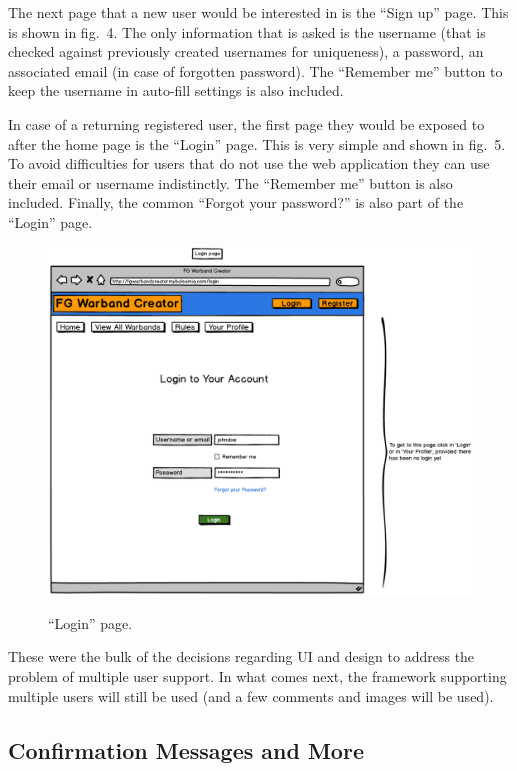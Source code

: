 \documentclass[12pt,a4paper]{article}
\begin{document}
The next page that a new user would be interested in is the ``Sign up'' page. This is shown in fig.~4. The only information that is asked is the username (that is checked against previously created usernames for uniqueness), a password, an associated email (in case of forgotten password). The ``Remember me'' button to keep the username in auto-fill settings is also included. 

In case of a returning registered user, the first page they would be exposed to after the home page is the ``Login'' page. This is very simple and shown in fig.~5. To avoid difficulties for users that do not use the web application they can use their email or username indistinctly. The ``Remember me'' button is also included. Finally, the common ``Forgot your password?'' is also part of the ``Login'' page.

\begin{figure}[h!]
 \centering
 \includegraphics[width=1\textwidth]{img/login}
 \label{fig:5}
 \caption{``Login'' page.}
\end{figure}

These were the bulk of the decisions regarding UI and design to address the problem of multiple user support. In what comes next, the framework supporting multiple users will still be used (and a few comments and images will be used).

\subsection{Confirmation Messages and More}
\end{document}
